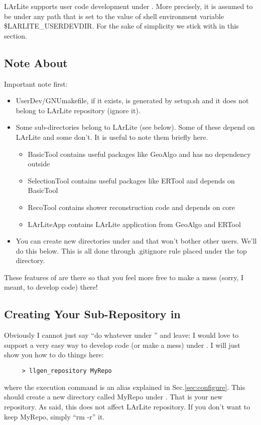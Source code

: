 
LArLite supports user code development under \UserDev.
More precisely, it is assumed to be under any path that is set to the value of shell environment variable {\ttfamily \$LARLITE\_USERDEVDIR}. 
For the sake of simplicity we stick with \UserDev in this section.

\subsection{Note About \UserDev}
Important note first:
\begin{itemize}
  \item {\ttfamily UserDev/GNUmakefile}, if it exists, is generated by setup.sh and it does not belong to LArLite repository (ignore it).
  \item Some sub-directories belong to LArLite (see below). Some of these depend on LArLite and some don't. It is useful to note them briefly here.
    \begin{itemize}
        \item {\ttfamily BasicTool} contains useful packages like {\ttfamily GeoAlgo} and has no dependency outside
        \item {\ttfamily SelectionTool} contains useful packages like {\ttfamily ERTool} and depends on {\ttfamily BasicTool}
        \item {\ttfamily RecoTool} contains shower reconstruction code and depends on {\ttfamily core}
        \item {\ttfamily LArLiteApp} contains LArLite application from {\ttfamily GeoAlgo} and {\ttfamily ERTool} 
    \end{itemize}
  \item You can create new directories under \UserDev and that won't bother other users. We'll do this below. 
  This is all done through {\ttfamily .gitignore} rule placed under the top directory. 
\end{itemize}

These features of \UserDev are there so that you feel more free to make a mess (sorry, I meant, to develop code) there!

\subsection{Creating Your Sub-Repository in \UserDev}
\label{sec:devrepo:makenew}
Obviously I cannot just say ``do whatever under \UserDev'' and leave: I would love to support a very easy way to develop code (or make a mess) under \UserDev. I will just show you how to do things here:
\begin{lstlisting}
     > llgen_repository MyRepo
\end{lstlisting}
where the execution command is an alias explained in Sec.\ref{sec:configure}.
This should create a new directory called {\ttfamily MyRepo} under \UserDev. 
That is your new repository. As said, this does not affect LArLite repository. 
If you don't want to keep {\ttfamily MyRepo}, simply ``{\ttfamily rm -r}'' it.


